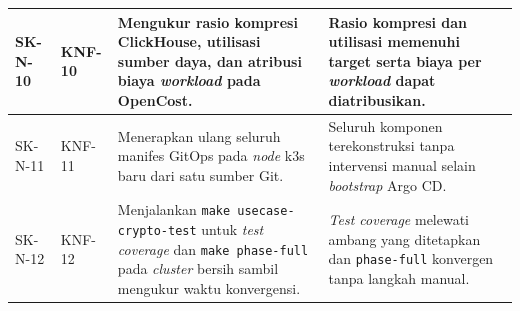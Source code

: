 {\begin{longtable}{|>{\centering\arraybackslash}m{1.4cm}|>{\centering\arraybackslash}m{1.75cm}|m{5.9cm}|m{4cm}|}
\hline
SK-N-10 & KNF-10 & Mengukur rasio kompresi ClickHouse, utilisasi sumber daya, dan atribusi biaya \textit{workload} pada OpenCost. & Rasio kompresi dan utilisasi memenuhi target serta biaya per \textit{workload} dapat diatribusikan. \\
\hline
SK-N-11 & KNF-11 & Menerapkan ulang seluruh manifes GitOps pada \textit{node} k3s baru dari satu sumber Git. & Seluruh komponen terekonstruksi tanpa intervensi manual selain \textit{bootstrap} Argo CD. \\
\hline
SK-N-12 & KNF-12 & Menjalankan \texttt{make usecase-crypto-test} untuk \textit{test coverage} dan \texttt{make phase-full} pada \textit{cluster} bersih sambil mengukur waktu konvergensi. & \textit{Test coverage} melewati ambang yang ditetapkan dan \texttt{phase-full} konvergen tanpa langkah manual. \\
\hline
\end{longtable}
}
